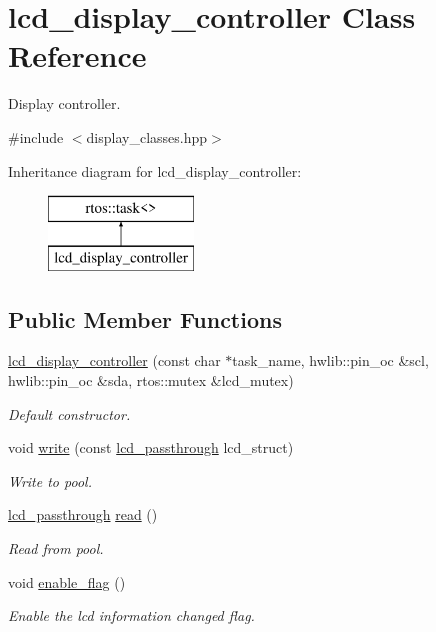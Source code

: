 \hypertarget{classlcd__display__controller}{}\section{lcd\+\_\+display\+\_\+controller Class Reference}
\label{classlcd__display__controller}


Display controller.  




{\ttfamily \#include $<$display\+\_\+classes.\+hpp$>$}

Inheritance diagram for lcd\+\_\+display\+\_\+controller\+:\begin{figure}[H]
\begin{center}
\leavevmode
\includegraphics[height=2.000000cm]{classlcd__display__controller}
\end{center}
\end{figure}
\subsection*{Public Member Functions}
\begin{DoxyCompactItemize}
\item 
\hyperlink{classlcd__display__controller_abf42bfd4d932278f5777df103c3fd27f}{lcd\+\_\+display\+\_\+controller} (const char $\ast$task\+\_\+name, hwlib\+::pin\+\_\+oc \&scl, hwlib\+::pin\+\_\+oc \&sda, rtos\+::mutex \&lcd\+\_\+mutex)
\begin{DoxyCompactList}\small\item\em Default constructor. \end{DoxyCompactList}\item 
void \hyperlink{classlcd__display__controller_a66aacdfab1cbf14bd9cfe844fbb34b8a}{write} (const \hyperlink{structlcd__passthrough}{lcd\+\_\+passthrough} lcd\+\_\+struct)
\begin{DoxyCompactList}\small\item\em Write to pool. \end{DoxyCompactList}\item 
\hyperlink{structlcd__passthrough}{lcd\+\_\+passthrough} \hyperlink{classlcd__display__controller_a9eb5a62f4b813f0ea44b3c7efaa6ec0a}{read} ()
\begin{DoxyCompactList}\small\item\em Read from pool. \end{DoxyCompactList}\item 
void \hyperlink{classlcd__display__controller_af37be06c27c0eb1e67dbeb8e8e2df8c1}{enable\+\_\+flag} ()
\begin{DoxyCompactList}\small\item\em Enable the lcd information changed flag. \end{DoxyCompactList}\end{DoxyCompactItemize}


